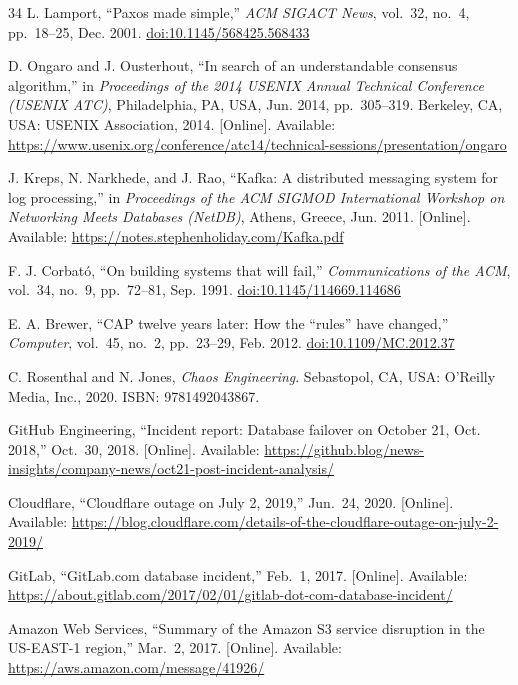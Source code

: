 \documentclass[conference]{IEEEtran}
\begin{document}
\begin{thebibliography}{34}
L. Lamport, ``Paxos made simple,'' \textit{ACM SIGACT News}, vol.~32, no.~4, pp.~18--25, Dec. 2001.
\href{https://doi.org/10.1145/568425.568433}{doi:10.1145/568425.568433}

D. Ongaro and J. Ousterhout, ``In search of an understandable consensus algorithm,'' in \textit{Proceedings of the 2014 USENIX Annual Technical Conference (USENIX ATC)}, Philadelphia, PA, USA, Jun. 2014, pp.~305--319. Berkeley, CA, USA: USENIX Association, 2014. [Online]. Available:
\url{https://www.usenix.org/conference/atc14/technical-sessions/presentation/ongaro}

J. Kreps, N. Narkhede, and J. Rao, ``Kafka: A distributed messaging system for log processing,'' in \textit{Proceedings of the ACM SIGMOD International Workshop on Networking Meets Databases (NetDB)}, Athens, Greece, Jun. 2011. [Online]. Available:
\url{https://notes.stephenholiday.com/Kafka.pdf}

F. J. Corbat\'o, ``On building systems that will fail,'' \textit{Communications of the ACM}, vol.~34, no.~9, pp.~72--81, Sep. 1991.
\href{https://doi.org/10.1145/114669.114686}{doi:10.1145/114669.114686}

E. A. Brewer, ``CAP twelve years later: How the ``rules'' have changed,'' \textit{Computer}, vol.~45, no.~2, pp.~23--29, Feb. 2012.
\href{https://doi.org/10.1109/MC.2012.37}{doi:10.1109/MC.2012.37}

C. Rosenthal and N. Jones, \textit{Chaos Engineering}. Sebastopol, CA, USA: O'Reilly Media, Inc., 2020.
ISBN: 9781492043867.

GitHub Engineering, ``Incident report: Database failover on October 21, Oct. 2018,'' Oct.~30, 2018. [Online]. Available:
\url{https://github.blog/news-insights/company-news/oct21-post-incident-analysis/}

Cloudflare, ``Cloudflare outage on July 2, 2019,'' Jun.~24, 2020. [Online]. Available:
\url{https://blog.cloudflare.com/details-of-the-cloudflare-outage-on-july-2-2019/}

GitLab, ``GitLab.com database incident,'' Feb.~1, 2017. [Online]. Available:
\url{https://about.gitlab.com/2017/02/01/gitlab-dot-com-database-incident/}

Amazon Web Services, ``Summary of the Amazon S3 service disruption in the US-EAST-1 region,'' Mar.~2, 2017. [Online]. Available:
\url{https://aws.amazon.com/message/41926/}


\end{thebibliography}
\end{document}
